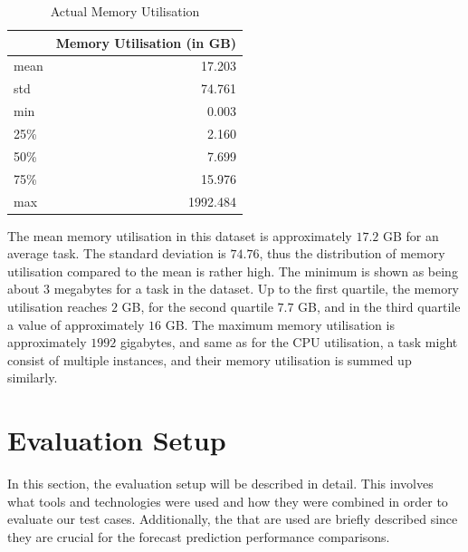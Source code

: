     \begin{table}
      \centering
      \caption{Actual Memory Utilisation}
      \label{tab:actual-memory-utilisation}
      \begin{tabular}{|l|r|}
        \toprule
        {} &  Memory Utilisation (in GB) \\
        \midrule
        mean  &    17.203 \\
        std   &    74.761 \\
        min   &     0.003 \\
        25\%   &     2.160 \\
        50\%   &     7.699 \\
        75\%   &    15.976 \\
        max   &  1992.484 \\
        \bottomrule
      \end{tabular}
    \end{table}
    The mean memory utilisation in this dataset is approximately $17.2$ GB for an average task.
    The standard deviation is $74.76$, thus the distribution of memory utilisation compared to the mean is rather high.
    The minimum is shown as being about $3$ megabytes for a task in the dataset.
    Up to the first quartile, the memory utilisation reaches $2$ GB, for the second quartile $7.7$ GB, and in the third quartile a value of approximately $16$ GB.
    The maximum memory utilisation is approximately $1992$ gigabytes, and same as for the CPU utilisation, a task might consist of multiple instances, and their memory utilisation is summed up similarly.
    




\section{Evaluation Setup}
\label{sec:evaluation-setup}

  In this section, the evaluation setup will be described in detail. 
  This involves what tools and technologies were used and how they were combined in order to evaluate our test cases. Additionally, the  that are used are briefly described since they are crucial for the forecast prediction performance comparisons.
  
